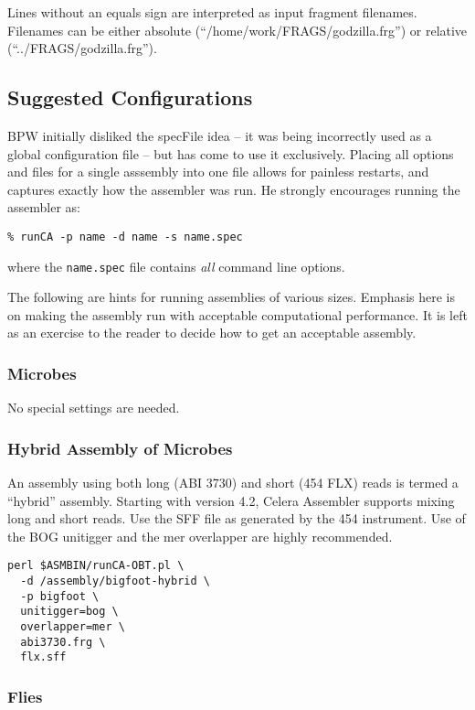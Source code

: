 \documentclass[twoside,11pt]{article}
\begin{document}
Lines without an equals sign are interpreted as input fragment
filenames.  Filenames can be either absolute
(``/home/work/FRAGS/godzilla.frg'') or relative
(``../FRAGS/godzilla.frg'').

\subsection{Suggested Configurations}

BPW initially disliked the specFile idea -- it was being incorrectly
used as a global configuration file -- but has come to use it
exclusively.  Placing all options and files for a single asssembly
into one file allows for painless restarts, and captures exactly how
the assembler was run.  He strongly encourages running the assembler
as:
\begin{verbatim}
% runCA -p name -d name -s name.spec
\end{verbatim}
where the {\tt name.spec} file contains {\it all} command line
options.

The following are hints for running assemblies of various sizes.
Emphasis here is on making the assembly run with acceptable
computational performance.  It is left as an exercise to the reader to
decide how to get an acceptable assembly.

\subsubsection{Microbes}

No special settings are needed.

\subsubsection{Hybrid Assembly of Microbes}

An assembly using both long (ABI 3730) and short (454 FLX) reads is
termed a ``hybrid'' assembly.  Starting with version 4.2, Celera
Assembler supports mixing long and short reads.  Use the SFF file as
generated by the 454 instrument.  Use of the BOG unitigger and the mer
overlapper are highly recommended.

\begin{verbatim}
perl $ASMBIN/runCA-OBT.pl \
  -d /assembly/bigfoot-hybrid \
  -p bigfoot \
  unitigger=bog \
  overlapper=mer \
  abi3730.frg \
  flx.sff
\end{verbatim}

\subsubsection{Flies}
\end{document}
